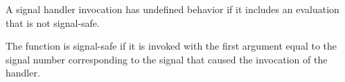 A signal handler invocation has undefined behavior if it includes
an evaluation that is not signal-safe.

\pnum
{}%
The function  is signal-safe if it is invoked
with the first argument equal to the signal number
corresponding to the signal that caused the invocation of the handler.


